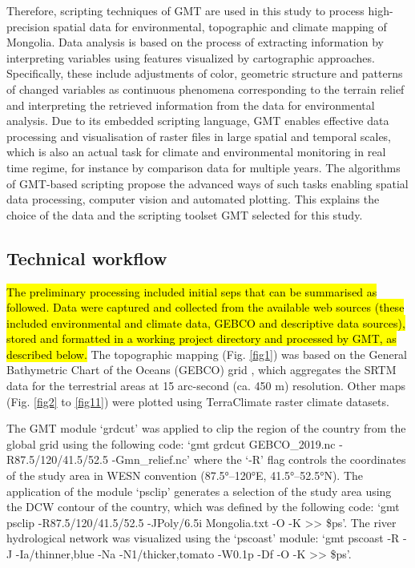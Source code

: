 \documentclass[geosciences,article,submit,pdftex,moreauthors]{Definitions/mdpi}
\begin{document}
Therefore, scripting techniques of GMT are used in this study to process high-precision spatial data for environmental, topographic and climate mapping of Mongolia. Data analysis is based on the process of extracting information by interpreting variables using features visualized by cartographic approaches. Specifically, these include adjustments of color, geometric structure and patterns of changed variables as continuous phenomena corresponding to the terrain relief and interpreting the retrieved information from the data for environmental analysis. Due to its embedded scripting language, GMT enables effective data processing and visualisation of raster files in large spatial and temporal scales, which is also an actual task for climate and environmental monitoring in real time regime, for instance by comparison data for multiple years. The algorithms of GMT-based scripting propose the advanced ways of such tasks enabling spatial data processing, computer vision and automated plotting. This explains the choice of the data and the scripting toolset GMT selected for this study.

\subsection{Technical workflow}
\hl{The preliminary processing included initial seps that can be summarised as followed. Data were captured and collected from the available web sources (these included environmental and climate data, GEBCO and descriptive data sources), stored and formatted in a working project directory and processed by GMT, as described below.} The topographic mapping (Fig. \ref{fig1}) was based on the General Bathymetric Chart of the Oceans (GEBCO) grid \cite{Schenke2016}, which aggregates the SRTM data for the terrestrial areas at 15 arc-second (ca. 450 m) resolution. Other maps (Fig. \ref{fig2} to \ref{fig11}) were plotted using TerraClimate raster climate datasets. 

The GMT module ‘grdcut’ was applied to clip the region of the country from the global grid using the following code: ‘gmt grdcut GEBCO\_2019.nc -R87.5/120/41.5/52.5 -Gmn\_relief.nc’ where the ‘-R’ flag controls the coordinates of the study area in WESN convention (87.5°–120°E, 41.5°–52.5°N). The application of the module ‘psclip’ generates a selection of the study area using the DCW contour of the country, which was defined by the following code: ‘gmt psclip -R87.5/120/41.5/52.5 -JPoly/6.5i Mongolia.txt -O -K >> \$ps’. The river hydrological network was visualized using the ‘pscoast’ module: ‘gmt pscoast -R -J -Ia/thinner,blue -Na -N1/thicker,tomato -W0.1p -Df -O -K >> \$ps’.  	
\end{document}
